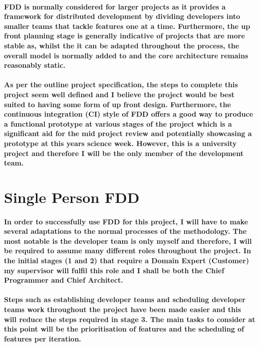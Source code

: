 \documentclass{article}
\begin{document}
\newpage

\paragraph{FDD is normally considered for larger projects as it provides a framework for distributed development by dividing developers into smaller teams that tackle features one at a time. Furthermore, the up front planning stage is generally indicative of projects that are more stable as, whilst the it can be adapted throughout the process, the overall model is normally added to and the core architecture remains reasonably static.}

\paragraph{As per the outline project specification, the steps to complete this project seem well defined and I believe the project would be best suited to having some form of up front design. Furthermore, the continuous integration (CI) style of FDD offers a good way to produce a functional prototype at various stages of the project which is a significant aid for the mid project review and potentially showcasing a prototype at this years science week. However, this is a university project and therefore I will be the only member of the development team. }

\section{Single Person FDD}
\paragraph{In order to successfully use FDD for this project, I will have to make several adaptations to the normal processes of the methodology. The most notable is the developer team is only myself and therefore, I will be required to assume many different roles throughout the project. In the initial stages (1 and 2) that require a Domain Expert (Customer) my supervisor will fulfil this role and I shall be both the Chief Programmer and Chief Architect.}

\paragraph{Steps such as establishing developer teams and scheduling developer teams work throughout the project have been made easier and this will reduce the steps required in stage 3. The main tasks to consider at this point will be the prioritisation of features and the scheduling of features per iteration.}
\end{document}
